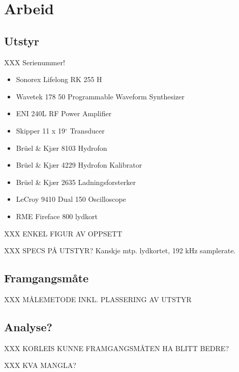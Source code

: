 \section{Arbeid}
\subsection{Utstyr}

XXX Serienummer!

\begin{itemize}
\item Sonorex Lifelong RK 255 H
\item Wavetek 178 \unit{50}{\mega\hertz} Programmable Waveform Synthesizer
\item ENI 240L RF Power Amplifier
\item Skipper 11 x 19${}^\circ$ Transducer
\item Brüel \& Kjær 8103 Hydrofon
\item Brüel \& Kjær 4229 Hydrofon Kalibrator
\item Brüel \& Kjær 2635 Ladningsforsterker
\item LeCroy 9410 Dual \unit{150}{\mega\hertz} Oscilloscope
\item RME Fireface 800 lydkort
\end{itemize}

XXX ENKEL FIGUR AV OPPSETT

XXX SPECS PÅ UTSTYR? Kanskje mtp. lydkortet, 192 kHz samplerate.
\subsection{Framgangsmåte}
XXX MÅLEMETODE INKL. PLASSERING AV UTSTYR

\subsection{Analyse?}
XXX KORLEIS KUNNE FRAMGANGSMÅTEN HA BLITT BEDRE?

XXX KVA MANGLA?
